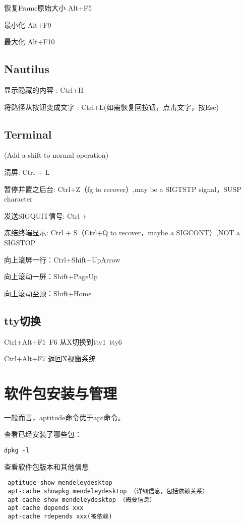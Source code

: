恢复Frame原始大小  Alt+F5

最小化 Alt+F9

最大化 Alt+F10

\subsection{Nautilus}

显示隐藏的内容 : Ctrl+H

将路径从按钮变成文字 :  Ctrl+L(如需恢复回按钮，点击文字，按Esc)


\subsection{Terminal}

(Add a shift to normal operation)

清屏: Ctrl + L

暂停并置之后台: Ctrl+Z（fg to recover）,may be a SIGTSTP signal，SUSP character

发送SIGQUIT信号: Ctrl + \

冻结终端显示: Ctrl + S（Ctrl+Q to recover，maybe a SIGCONT）,NOT a SIGSTOP

向上滚屏一行：Ctrl+Shift+UpArrow

向上滚动一屏：Shift+PageUp

向上滚动至顶：Shift+Home


\subsection{tty切换}
Ctrl+Alt+F1~F6 从X切换到tty1~tty6

Ctrl+Alt+F7 返回X视窗系统











\section{软件包安装与管理}

一般而言，aptitude命令优于apt命令。

查看已经安装了哪些包：
\begin{verbatim}
dpkg -l
\end{verbatim}

查看软件包版本和其他信息
\begin{verbatim}
 aptitude show mendeleydesktop
 apt-cache showpkg mendeleydesktop （详细信息，包括依赖关系）
 apt-cache show mendeleydesktop （概要信息）
 apt-cache depends xxx
 apt-cache rdepends xxx(被依赖)
\end{verbatim}

